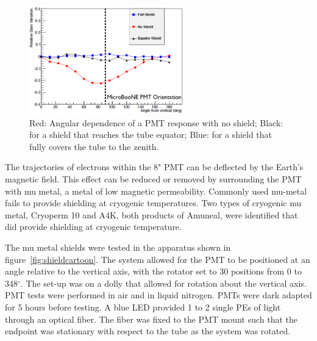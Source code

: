 \begin{figure}[t]
\centering 
\includegraphics[width=0.6\textwidth]{./light_figures/shield.png}
\caption{Red:  Angular dependence of a PMT response with no shield;  Black:  for a shield that reaches the tube equator;  Blue: for a shield that fully covers the tube to the zenith. \label{fig:shield}  }
\end{figure}



The trajectories of electrons within the 8" PMT can be deflected by the Earth's magnetic field.  This effect can be reduced or removed by surrounding the PMT with mu metal, a metal of low magnetic permeability.  Commonly used mu-metal fails to provide shielding at cryogenic temperatures. Two types of cryogenic mu metal, Cryoperm 10 and A4K, both products of Amuneal, were identified that did provide shielding at cryogenic temperature. 

The mu metal shields were tested in the apparatus shown in figure~\ref{fig:shieldcartoon}.  The system allowed for the PMT to be positioned at an angle relative to the vertical axis, with the rotator set to 30 positions from 0 to 348$^\circ$.    The set-up was on a dolly that allowed for rotation about the vertical axis.  PMT tests were performed in air and in liquid nitrogen.   PMTs were dark adapted for 5 hours before testing.  %
A blue LED provided 1 to 2 single PEs of light through an optical fiber.   The fiber was fixed to the PMT mount such that the endpoint was stationary with respect to the tube as the system was rotated.   

